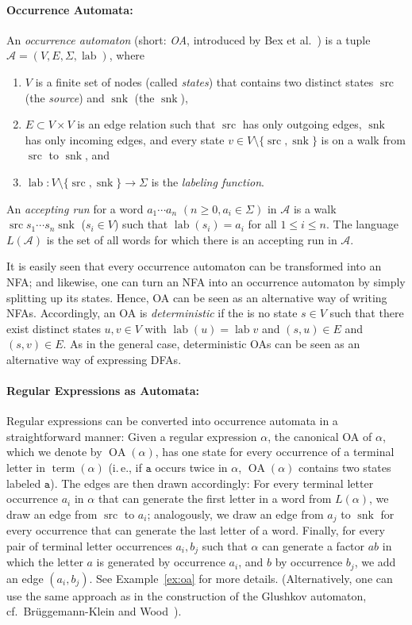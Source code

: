 \documentclass[a4paper,11pt, svgnames,titlepage]{article}
\DeclareMathOperator{\lab}{lab}
\DeclareMathOperator{\src}{src}
\DeclareMathOperator{\snk}{snk}
\DeclareMathOperator{\OA}{OA}
\DeclareMathOperator{\term}{term}
\begin{document}
\paragraph{Occurrence Automata:} An \emph{occurrence automaton} (short: \emph{OA}, introduced by Bex et al.~\cite{bex:kore}) is a tuple $\mathcal{A}=(V,E,\Sigma,\lab)$, where 
\begin{enumerate}
	\item $V$ is a finite set of nodes (called \emph{states}) that contains two distinct states $\src$ (the \emph{source}) and $\snk$ (the $\snk$),
	\item $E\subset V\times V$ is an edge relation such that $\src$ has only outgoing edges, $\snk$ has only incoming edges, and every state $v\in V\setminus\{\src,\snk\}$ is on a walk from $\src$ to $\snk$, and
	\item $\lab: V\setminus\{\src,\snk\} \to \Sigma $ is the \emph{labeling function}. 
\end{enumerate}
An \emph{accepting run} for a word $a_1 \cdots a_n$ $(n\geq 0, a_i\in\Sigma)$ in $\mathcal{A}$ is a walk $\src s_1 \cdots s_n \snk$ ($s_i\in V$) such that $\lab(s_i)=a_i$ for all $1\leq i \leq n$. The language $L(\mathcal{A})$ is the set of all words for which there is an accepting run in $\mathcal{A}$.

It is easily seen that every occurrence automaton can be transformed into an NFA; and likewise, one can turn an NFA into an occurrence automaton by simply splitting up its states. Hence, OA can be seen  as an alternative way of writing NFAs. Accordingly, an OA is \emph{deterministic} if the is no state $s\in V$ such that there exist distinct states $u,v\in V$ with $\lab(u)=\lab{v}$ and $(s,u)\in E$ and $(s,v)\in E$. As in the general case, deterministic OAs can be seen as an alternative way of expressing DFAs.

\paragraph{Regular Expressions as Automata:} Regular expressions can be converted into occurrence automata in a straightforward manner: Given a regular expression $\alpha$, the canonical OA of $\alpha$, which we denote by $\OA(\alpha)$, has one state for every occurrence of a terminal letter in $\term(\alpha)$ (i.\,e., if $\mathtt{a}$ occurs twice in $\alpha$, $\OA(\alpha)$ contains two states labeled $\mathtt{a}$). The edges are then drawn accordingly: For every terminal letter occurrence $a_i$ in $\alpha$ that can generate the first letter in a word from $L(\alpha)$, we draw an edge from $\src$ to $a_i$; analogously, we draw an edge from $a_j$ to $\snk$ for every occurrence that can generate the last letter of a word. Finally, for every pair of terminal letter occurrences $a_i,b_j$ such that $\alpha$ can generate a factor $ab$ in which the letter $a$ is generated by occurrence $a_i$, and $b$ by occurrence $b_j$, we add an edge $(a_i,b_j)$. See Example~\ref{ex:oa} for more details. (Alternatively, one can use the same approach as in the construction of the Glushkov automaton, cf.\ Brüggemann-Klein and Wood~\cite{bru:one}).
\end{document}
